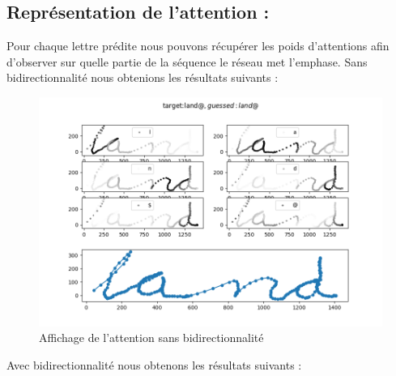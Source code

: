     


\subsection{Représentation de l'attention :}
    Pour chaque lettre prédite nous pouvons récupérer les poids d'attentions afin d'observer sur quelle partie de la séquence le réseau met l'emphase.
    \newline Sans bidirectionnalité nous obtenions les résultats suivants :
    \begin{figure}[!ht]
        \centering
        \includegraphics[width=120mm]{sections/images/interpretation/lastGRUatt2.png}
        \caption{Affichage de l'attention sans bidirectionnalité}
        \label{fig:Figure 12  }
    \end{figure}
    
    Avec bidirectionnalité nous obtenons les résultats suivants :
    
